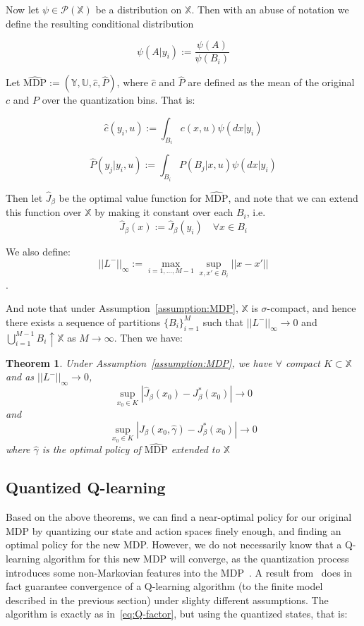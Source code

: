 \documentclass{article}
\newtheorem{theorem}{Theorem}[section]
\begin{document}
Now let \(\psi \in \mathcal{P}(\mathbb{X})\) be a distribution on \(\mathbb{X}\). Then with an abuse of notation we define the resulting conditional distribution

\[\psi(A | y_i) := \frac{\psi(A)}{\psi(B_i)}\]

Let \(\hat{\text{MDP}} := (\mathbb{Y}, \mathbb{U}, \hat{c}, \hat{P})\), where \(\hat{c}\) and \(\hat{P}\) are defined as the mean of the original \(c\) and \(P\) over the quantization bins. That is:

\begin{equation} \hat{c}(y_i,u) := \int_{B_i}c(x,u)\psi(dx | y_i)\label{eq:hats} \end{equation}

\[ \hat{P}(y_j | y_i,u) := \int_{B_i}P(B_j | x,u)\psi(dx | y_i) \]

Then let \(\hat{J}_\beta\) be the optimal value function for \(\hat{\text{MDP}}\), and note that we can extend this function over \(\mathbb{X}\) by making it constant over each \(B_i\), i.e.
\[ \hat{J}_\beta(x) := \hat{J}_\beta(y_i) \quad \forall x \in B_i \]

We also define:
\[ ||L^-||_\infty := \max_{i=1,\ldots,M-1} \sup_{x,x' \in B_i}||x-x'||\].

And note that under Assumption~\ref{assumption:MDP}, \(\mathbb{X}\) is \(\sigma\)-compact, and hence there exists a sequence of partitions \(\{B_i\}_{i=1}^M\) such that \(||L^-||_\infty \to 0\) and \(\bigcup_{i=1}^{M-1}B_i \uparrow \mathbb{X}\) as \(M \to \infty\). Then we have:

\begin{theorem}\label{theorem:2.3}\cite[Theorem 4.27]{Quantized_Models}
    Under Assumption~\ref{assumption:MDP}, we have \(\forall\) compact \(K \subset \mathbb{X}\) and as \(||L^-||_\infty \to 0\),
    \[ \sup_{x_0 \in K}|\hat{J}_\beta(x_0) - J^*_\beta(x_0)| \to 0 \]
    and
    \[ \sup_{x_0 \in K}|J_\beta(x_0,\hat{\gamma}) - J^*_\beta(x_0)| \to 0 \]
    where \(\hat{\gamma}\) is the optimal policy of \(\hat{\text{MDP}}\) extended to \(\mathbb{X}\)
\end{theorem}

\subsection{Quantized Q-learning}
Based on the above theorems, we can find a near-optimal policy for our original MDP by quantizing our state and action spaces finely enough, and finding an optimal policy for the new MDP. However, we do not necessarily know that a Q-learning algorithm for this new MDP will converge, as the quantization process introduces some non-Markovian features into the MDP~\cite{Kara}. A result from~\cite{Kara} does in fact guarantee convergence of a Q-learning algorithm (to the finite model described in the previous section) under slighty different assumptions. The algorithm is exactly as in~\eqref{eq:Q-factor}, but using the quantized states, that is:
\end{document}
